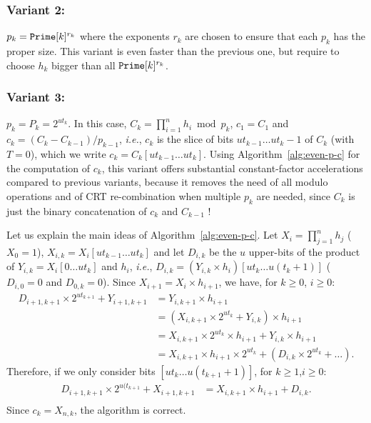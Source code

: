 \documentclass[11pt]{llncs}
\begin{document}
\subsubsection{Variant 2:} $p_k=\mbox{{\tt Prime}}[k]^{r_k}$ where the exponents $r_k$ are chosen to ensure that each $p_k$ has the proper size.
This variant is even faster than the previous one, but require to choose $h_k$ bigger than all
$\mbox{{\tt Prime}}[k]^{r_k}$. 

\subsubsection{Variant 3:} $p_k = P_k = 2^{ut_k}$. 
In this case, $C_k = \prod_{i=1}^n h_i \bmod p_k$, $c_1 = C_1$ and $c_k = (C_k - C_{k-1}) / p_{k-1}$, {\it i.e.}, $c_k$ is the slice of bits $ut_{k-1}\dots ut_k-1$ of $C_k$ (with $T = 0$), which we write $c_k = C_k[ut_{k-1}\dots ut_k]$.
Using Algorithm~\ref{alg:even-p-c} for the computation of $c_k$, this variant offers substantial constant-factor accelerations compared to previous variants, because it removes the need of all modulo operations and of CRT re-combination when multiple $p_k$ are needed, since $C_k$ is just the binary concatenation of $c_k$ and $C_{k-1}$ !

Let us explain the main ideas of Algorithm~\ref{alg:even-p-c}.
Let $X_i = \prod_{j=1}^n h_j$ ($X_0 = 1$), $X_{i,k} = X_i[ut_{k-1}\dots ut_{k}]$ and let $D_{i,k}$ be the $u$ upper-bits of the product of $Y_{i,k} = X_i[0\dots ut_{k}]$ and $h_i$, {\it i.e.}, $D_{i,k} = (Y_{i,k} \times h_i)[ut_k\dots u(t_k+1)]$ ($D_{i,0} = 0$ and $D_{0,k} = 0$).
Since $X_{i+1} = X_i \times h_{i+1}$, we have, for $k \ge 0$, $i \ge 0$:
\begin{align*}
  D_{i+1,k+1} \times 2^{ut_{k+1}} + Y_{i+1,k+1} &= Y_{i,k+1} \times h_{i+1} \\
                 &= (X_{i,k+1} \times 2^{ut_{k}} + Y_{i,k}) \times h_{i+1} \\
                 &= X_{i,k+1} \times 2^{ut_k} \times h_{i+1} + Y_{i,k} \times h_{i+1} \\
                 &= X_{i,k+1}  \times h_{i+1} \times 2^{ut_k} + (D_{i,k} \times 2^{ut_k} + \dots).
\end{align*}
Therefore, if we only consider bits $[ut_k \dots u(t_{k+1}+1)]$, for $k\ge1$,$i\ge0$:
\begin{align*}
  D_{i+1,k+1} \times 2^{u(t_{k+1}} + X_{i+1,k+1} &= X_{i,k+1} \times h_{i+1} + D_{i,k}. \\
\end{align*}
Since $c_k = X_{n,k}$, the algorithm is correct.
\end{document}
